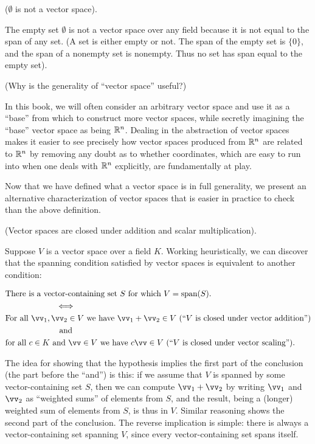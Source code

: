 \begin{remark}
    ($\emptyset$ is not a vector space).
    
    The empty set $\emptyset$ is not a vector space over any field because it is not equal to the span of any set. (A set is either empty or not. The span of the empty set is $\{0\}$, and the span of a nonempty set is nonempty. Thus no set has span equal to the empty set).
\end{remark}

\begin{remark}
    (Why is the generality of ``vector space'' useful?)
    
    In this book, we will often consider an arbitrary vector space and use it as a ``base'' from which to construct more vector spaces, while secretly imagining the ``base'' vector space as being $\mathbb{R}^n$. Dealing in the abstraction of vector spaces makes it easier to see precisely how vector spaces produced from $\mathbb{R}^n$ are related to $\mathbb{R}^n$ by removing any doubt as to whether coordinates, which are easy to run into when one deals with $\mathbb{R}^n$ explicitly, are fundamentally at play.
\end{remark}

Now that we have defined what a vector space is in full generality, we present an alternative characterization of vector spaces that is easier in practice to check than the above definition. 

\begin{deriv}
    (Vector spaces are closed under addition and scalar multiplication).
    
    Suppose $V$ is a vector space over a field $K$. Working heuristically, we can discover that the spanning condition satisfied by vector spaces is equivalent to another condition:
    
    \begin{align*}
        &\text{There is a vector-containing set $S$ for which $V = \spann(S)$.} \\
        &\quad \quad \quad \quad \quad \quad \iff \\
        &\text{For all $\vv_1, \vv_2 \in V$ we have $\vv_1 + \vv_2 \in V$ (``$V$ is closed under vector addition'')} \\
        &\quad \quad \quad \quad \quad \quad \spc \spc \text{and} \\
        &\text{for all $c \in K$ and $\vv \in V$ we have $c \vv \in V$ (``$V$ is closed under vector scaling'')}.
    \end{align*}
    
    The idea for showing that the hypothesis implies the first part of the conclusion (the part before the ``and'') is this: if we assume that $V$ is spanned by some vector-containing set $S$, then we can compute $\vv_1 + \vv_2$ by writing $\vv_1$ and $\vv_2$ as ``weighted sums'' of elements from $S$, and the result, being a (longer) weighted sum of elements from $S$, is thus in $V$. Similar reasoning shows the second part of the conclusion. The reverse implication is simple: there is always a vector-containing set spanning $V$, since every vector-containing set spans itself.
\end{deriv}

